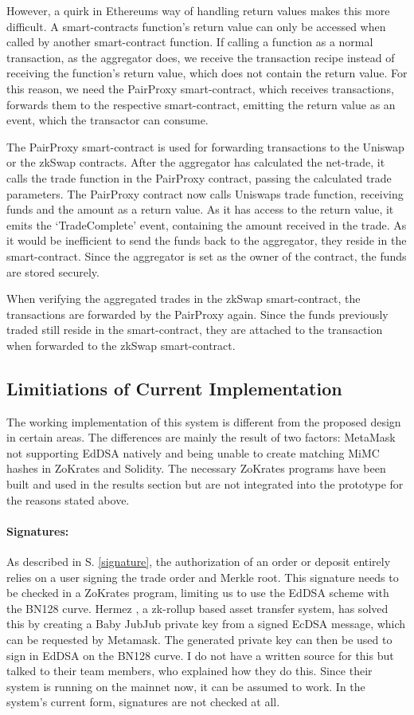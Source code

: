 \documentclass[../../thesis.tex]{subfiles}
\begin{document}
However, a quirk in Ethereums way of handling return values makes this more difficult. A smart-contracts function's return value can only be accessed when called by another smart-contract function. If calling a function as a normal transaction, as the aggregator does, we receive the transaction recipe instead of receiving the function's return value, which does not contain the return value. For this reason, we need the PairProxy smart-contract, which receives transactions, forwards them to the respective smart-contract, emitting the return value as an event, which the transactor can consume. 

The PairProxy smart-contract is used for forwarding transactions to the Uniswap or the zkSwap contracts. After the aggregator has calculated the net-trade, it calls the trade function in the PairProxy contract, passing the calculated trade parameters. The PairProxy contract now calls Uniswaps trade function, receiving funds and the amount as a return value. As it has access to the return value, it emits the `TradeComplete' event, containing the amount received in the trade. As it would be inefficient to send the funds back to the aggregator, they reside in the smart-contract. Since the aggregator is set as the owner of the contract, the funds are stored securely.

When verifying the aggregated trades in the zkSwap smart-contract, the transactions are forwarded by the PairProxy again. Since the funds previously traded still reside in the smart-contract, they are attached to the transaction when forwarded to the zkSwap smart-contract.

\subsection{Limitiations of Current Implementation}
The working implementation of this system is different from the proposed design in certain areas. The differences are mainly the result of two factors: MetaMask not supporting EdDSA natively and being unable to create matching MiMC hashes in ZoKrates and Solidity. The necessary ZoKrates programs have been built and used in the results section but are not integrated into the prototype for the reasons stated above. 

\paragraph{Signatures:}
As described in S. \ref{signature}, the authorization of an order or deposit entirely relies on a user signing the trade order and Merkle root. This signature needs to be checked in a ZoKrates program, limiting us to use the EdDSA scheme with the BN128 curve. Hermez \cite{hermez_docs}, a zk-rollup based asset transfer system, has solved this by creating a Baby JubJub\cite{baylinaeddsa} private key from a signed EcDSA message, which can be requested by Metamask. The generated private key can then be used to sign in EdDSA on the BN128 curve. I do not have a written source for this but talked to their team members, who explained how they do this. Since their system is running on the mainnet now, it can be assumed to work. In the system's current form, signatures are not checked at all.
\end{document}
